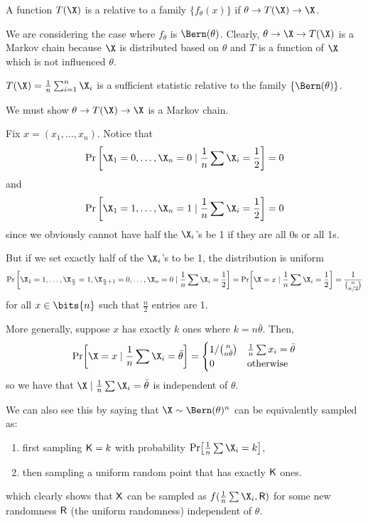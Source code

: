 \documentclass[class=co432,notes,tikz]{agony}
\begin{document}
\begin{defn}
  A function $T(\X)$ is a 
  relative to a family $\{f_\theta(x)\}$ if $\theta \to T(\X) \to \X$.
\end{defn}

We are considering the case where $f_\theta$ is $\Bern(\theta)$.
Clearly, $\theta \to \X \to T(\X)$ is a Markov chain
because $\X$ is distributed based on $\theta$ and $T$ is a function of
$\X$ which is not influenced $\theta$.

\begin{example}
  $T(\X) = \frac1n\sum_{i=1}^n \X_i$ is a sufficient statistic
  relative to the family $\{\Bern(\theta)\}$.
\end{example}
\begin{prf}
  We must show $\theta \to T(\X) \to \X$ is a Markov chain.

  Fix $x = (x_1,\dotsc,x_n)$. Notice that
  \[ \Pr\qty[\X_1=0,\dotsc,\X_n=0 \mid \frac1n\sum \X_i = \frac12] = 0 \]
  and
  \[ \Pr\qty[\X_1=1,\dotsc,\X_n=1 \mid \frac1n\sum \X_i = \frac12] = 0 \]
  since we obviously cannot have half the $\X_i$'s be 1 if they are all 0s or all 1s.

  But if we set exactly half of the $\X_i$'s to be 1, the distribution is uniform
  \[ \Pr\qty[\X_1=1,\dotsc,\X_{\frac{n}{2}}=1,\X_{\frac{n}{2}+1}=0,\dotsc,\X_n=0 \mid \frac1n\sum\X_i = \frac12] = \Pr[\X=x \mid \frac1n\sum\X_i = \frac12] = \frac{1}{\binom{n}{n/2}} \]
  for all $x\in\bits{n}$ such that $\frac{n}{2}$ entries are 1.

  More generally, suppose $x$ has exactly $k$ ones where $k = n\bar\theta$. Then,
  \[
    \Pr[\X=x \mid \frac1n\sum\X_i = \bar\theta] = \begin{cases}
      1/\binom{n}{n\bar\theta} & \frac1n\sum x_i = \bar\theta \\
      0                        & \text{otherwise}
    \end{cases}
  \]
  so we have that $\X \mid \frac1n\sum\X_i = \bar\theta$ is independent of $\theta$.

  We can also see this by saying that $\X \sim \Bern(\theta)^n$
  can be equivalently sampled as:
  \begin{enumerate}
    \item first sampling $\mathsf K = k$ with probability $\Pr[\frac1n\sum\X_i=k]$,
    \item then sampling a uniform random point that has exactly $\mathsf K$ ones.
  \end{enumerate}
  which clearly shows that $\mathsf X$ can be sampled as $f(\frac1n\sum\X_i,\rv R)$
  for some new randomness $\mathsf R$ (the uniform randomness) independent of $\theta$.
\end{prf}
\end{document}
